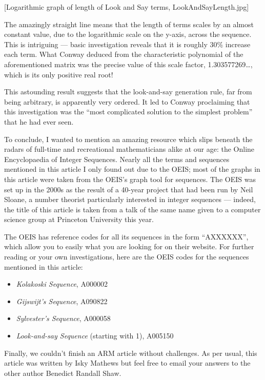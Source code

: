 \documentclass[titlepage,a4paper]{article}
\begin{document}
[Logarithmic graph of length of Look and Say terms, LookAndSayLength.jpg]

The amazingly straight line means that the length of terms scales by an almost constant value, due to the logarithmic scale on the y-axis, across the sequence. This is intriguing --- basic investigation reveals that it is roughly 30\% increase each term. What Conway deduced from the characteristic polynomial of the aforementioned matrix was the precise value of this scale factor, 1.303577269\ldots, which is its only positive real root!\par
This astounding result suggests that the look-and-say generation rule, far from being arbitrary, is apparently very ordered. It led to Conway proclaiming that this investigation was the “most complicated solution to the simplest problem” that he had ever seen.\par
To conclude, I wanted to mention an amazing resource which slips beneath the radars of full-time and recreational mathematicians alike at our age: the Online Encyclopaedia of Integer Sequences. Nearly all the terms and sequences mentioned in this article I only found out due to the OEIS; most of the graphs in this article were taken from the OEIS’s graph tool for sequences. The OEIS was set up in the 2000s as the result of a 40-year project that had been run by Neil Sloane, a number theorist particularly interested in integer sequences --- indeed, the title of this article is taken from a talk of the same name given to a computer science group at Princeton University this year.\par
The OEIS has reference codes for all its sequences in the form “AXXXXXX”, which allow you to easily what you are looking for on their website. For further reading or your own investigations, here are the OEIS codes for the sequences mentioned in this article:

\begin{itemize}
\item{\textit{Kolakoski Sequence}, A000002}
\item{\textit{Gijswijt’s Sequence}, A090822}
\item{\textit{Sylvester’s Sequence}, A000058}
\item{\textit{Look-and-say Sequence} (starting with 1), A005150}
\end{itemize}

Finally, we couldn’t finish an ARM article without challenges. As per usual, this article was written by Isky Mathews but feel free to email your answers to the other author Benedict Randall Shaw.
\end{document}
